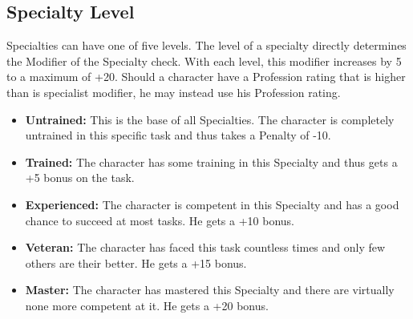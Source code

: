 \subsection{Specialty Level}
Specialties can have one of five levels. The level of a specialty directly determines the Modifier of the Specialty check. With each level, this modifier increases by 5 to a maximum of +20. Should a character have a Profession rating that is higher than is specialist modifier, he may instead use his Profession rating.
\begin{itemize}
	\item \textbf{Untrained:} This is the base of all Specialties. The character is completely untrained in this specific task and thus takes a Penalty of -10.
	\item \textbf{Trained:} The character has some training in this Specialty and thus gets a +5 bonus on the task.
	\item \textbf{Experienced:} The character is competent in this Specialty and has a good chance to succeed at most tasks. He gets a +10 bonus.
	\item \textbf{Veteran:} The character has faced this task countless times and only few others are their better. He gets a +15 bonus.
	\item \textbf{Master:} The character has mastered this Specialty and there are virtually none more competent at it. He gets a +20 bonus.
\end{itemize}

